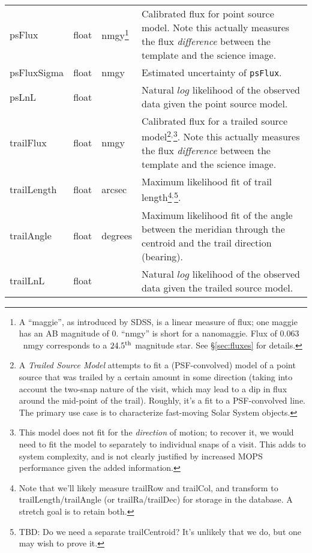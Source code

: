 \documentclass[12pt]{article}
\begin{document}
\begin{center}
\begin{longtable}{p{3cm}p{2cm}p{2cm}p{5cm}}
psFlux & float & nmgy\footnote{A ``maggie'', as introduced by SDSS, is a linear measure of flux; one maggie has an AB magnitude of 0. ``nmgy'' is short for a nanomaggie. Flux of $0.063$~nmgy corresponds to a $24.5^{\rm th}$ magnitude star. See \S \ref{sec:fluxes} for details.} & Calibrated flux for point source model. Note this actually measures the flux {\em difference} between the template and the science image. \\ 

psFluxSigma & float & nmgy & Estimated uncertainty of \texttt{psFlux}. \\

psLnL & float & ~ & Natural $log$ likelihood of the observed data given the point source model. \\ 

trailFlux & float & nmgy & Calibrated flux for a trailed source model\footnote{A {\em Trailed Source Model} attempts to fit a (PSF-convolved) model of a point source that was trailed by a certain amount in some direction (taking into account the two-snap nature of the visit, which may lead to a dip in flux around the mid-point of the trail). Roughly, it's a fit to a PSF-convolved line. The primary use case is to characterize fast-moving Solar System objects.}$^,$\footnote{This model does not fit for the {\em direction} of motion; to recover it, we would need to fit the model to separately to individual snaps of a visit. This adds to system complexity, and is not clearly justified by increased MOPS performance given the added information.}. Note this actually measures the flux {\em difference} between the template and the science image. \\ 

trailLength & float & arcsec & Maximum likelihood fit of trail length\footnote{Note that we'll likely measure trailRow and trailCol, and transform to trailLength/trailAngle (or trailRa/trailDec) for storage in the database. A stretch goal is to retain both.}$^,$\footnote{TBD: Do we need a separate trailCentroid? It's unlikely that we do, but one may wish to prove it.}. \\ 

trailAngle & float & degrees & Maximum likelihood fit of the angle between the meridian through the centroid and the trail direction (bearing). \\ 

trailLnL & float & ~ & Natural $log$ likelihood of the observed data given the trailed source model. \\ 


\end{longtable}
\end{center}
\end{document}
